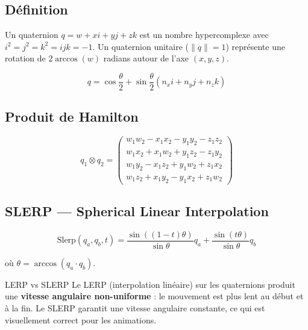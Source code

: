 \documentclass[12pt,a4paper]{report}
\begin{document}
\subsection{Définition}

Un quaternion $q = w + xi + yj + zk$ est un nombre hypercomplexe avec
$i^2 = j^2 = k^2 = ijk = -1$. Un quaternion unitaire ($\|q\| = 1$)
représente une rotation de $2\arccos(w)$ radians autour de l'axe
$(x, y, z)$.

\begin{equation}
    q = \cos\frac{\theta}{2} + \sin\frac{\theta}{2}(n_x i + n_y j + n_z k)
\end{equation}

\subsection{Produit de Hamilton}

\begin{equation}
    q_1 \otimes q_2 =
    \begin{pmatrix}
        w_1 w_2 - x_1 x_2 - y_1 y_2 - z_1 z_2 \\
        w_1 x_2 + x_1 w_2 + y_1 z_2 - z_1 y_2 \\
        w_1 y_2 - x_1 z_2 + y_1 w_2 + z_1 x_2 \\
        w_1 z_2 + x_1 y_2 - y_1 x_2 + z_1 w_2
    \end{pmatrix}
\end{equation}

\subsection{SLERP --- Spherical Linear Interpolation}

\begin{equation}
    \text{Slerp}(q_a, q_b, t) =
    \frac{\sin((1-t)\theta)}{\sin\theta} q_a
    + \frac{\sin(t\theta)}{\sin\theta} q_b
\end{equation}

où $\theta = \arccos(q_a \cdot q_b)$.

\begin{warningbox}{LERP vs SLERP}
Le LERP (interpolation linéaire) sur les quaternions produit une
\textbf{vitesse angulaire non-uniforme} : le mouvement est plus lent
au début et à la fin. Le SLERP garantit une vitesse angulaire
constante, ce qui est visuellement correct pour les animations.
\end{warningbox}

\end{document}
